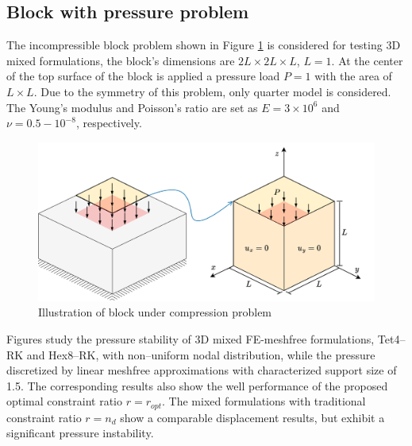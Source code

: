 \subsection{Block with pressure problem}
The incompressible block problem shown in Figure \ref{fg:block_model} is considered for testing 3D mixed formulations,
the block's dimensions are $2L\times 2L \times L$, $L=1$. At the center of the top surface of the block is applied a pressure load $P = 1$ with the area of $L\times L$.
Due to the symmetry of this problem, only quarter model is considered.
The Young's modulus and Poisson's ratio are set as $E = 3\times 10^6$ and $\nu = 0.5-10^{-8}$, respectively.

\begin{figure}[H]
\centering
\includegraphics[width=\textwidth]{png/block.png}
\caption{Illustration of block under compression problem}\label{fg:block_model}
\end{figure}

Figures study the pressure stability of 3D mixed FE-meshfree formulations, Tet4--RK and Hex8--RK, with non--uniform nodal distribution, while the pressure discretized by linear meshfree approximations with characterized support size of 1.5.
The corresponding results also show the well performance of the proposed optimal constraint ratio $r=r_{opt}$.
The mixed formulations with traditional constraint ratio $r=n_d$ show a comparable displacement results, but exhibit a significant pressure instability.
